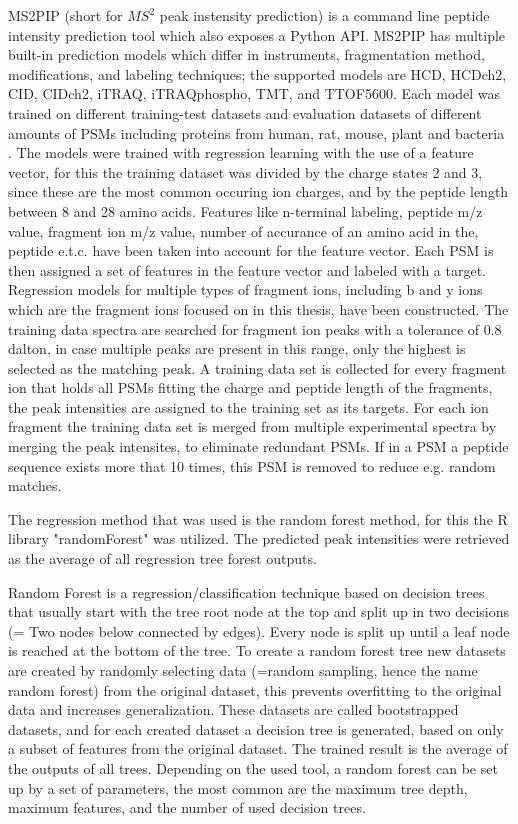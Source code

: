 \documentclass[11pt]{article}
\begin{document}
MS2PIP\cite{ms2pip, ms2pip-server} (short for \(MS^2\) peak instensity prediction) is a command line peptide intensity prediction tool which also exposes a Python API. MS2PIP has multiple built-in prediction models which differ in instruments, fragmentation method, modifications, and labeling techniques; the supported models are HCD, HCDch2, CID, CIDch2, iTRAQ, iTRAQphospho, TMT, and TTOF5600. Each model was trained on different training-test datasets and evaluation datasets of different amounts of PSMs including proteins from human, rat, mouse, plant and bacteria \cite{ms2pip}. The models were trained with regression learning with the use of a feature vector, for this the training dataset was divided by the charge states 2 and 3, since these are the most common occuring ion charges, and by the peptide length between 8 and 28 amino acids. Features like n-terminal labeling, peptide m/z value, fragment ion m/z value, number of accurance of an amino acid in the, peptide e.t.c. have been taken into account for the feature vector. Each PSM is then assigned a set of features in the feature vector and labeled with a target. Regression models for multiple types of fragment ions, including b and y ions which are the fragment ions focused on in this thesis, have been constructed. The training data spectra are searched for fragment ion peaks with a tolerance of 0.8 dalton, in case multiple peaks are present in this range, only the highest is selected as the matching peak. A training data set is collected for every fragment ion that holds all PSMs fitting the charge and peptide length of the fragments, the peak intensities are assigned to the training set as its targets. For each ion fragment the training data set is merged from multiple experimental spectra by merging the peak intensites, to eliminate redundant PSMs. If in a PSM a peptide sequence exists more that 10 times, this PSM is removed to reduce e.g. random matches.

The regression method that was used is the random forest method, for this the R library "randomForest" was utilized. The predicted peak intensities were retrieved as the average of all regression tree forest outputs.

Random Forest \cite{random-forest} is a regression/classification technique based on decision trees that usually start with the tree root node at the top and split up in two decisions (= Two nodes below connected by edges). Every node is split up until a leaf node is reached at the bottom of the tree. To create a random forest tree new datasets are created by randomly selecting data (=random sampling, hence the name random forest) from the original dataset, this prevents overfitting to the original data and increases generalization. These datasets are called bootstrapped datasets, and for each created dataset a decision tree is generated, based on only a subset of features from the original dataset. The trained result is the average of the outputs of all trees. Depending on the used tool, a random forest can be set up by a set of parameters, the most common are the maximum tree depth, maximum features, and the number of used decision trees.
\end{document}
